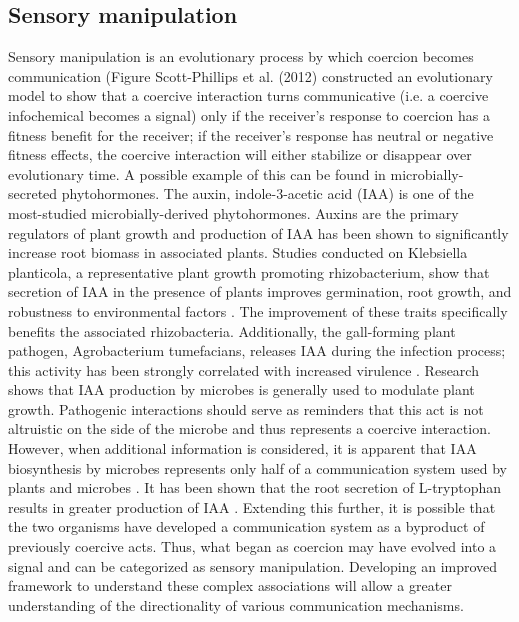 \subsection{Sensory manipulation} 
Sensory manipulation is an evolutionary process by which coercion becomes communication (Figure Scott-Phillips et al. (2012) constructed an evolutionary model to show that a coercive interaction turns communicative (i.e. a coercive infochemical becomes a signal) only if the receiver’s response to coercion has a fitness benefit for the receiver; if the receiver’s response has neutral or negative fitness effects, the coercive interaction will either stabilize or disappear over evolutionary time. 
A possible example of this can be found in microbially-secreted phytohormones. The auxin, indole-3-acetic acid (IAA) is one of the most-studied microbially-derived phytohormones. Auxins are the primary regulators of plant growth and production of IAA has been shown to significantly increase root biomass in associated plants. Studies conducted on Klebsiella planticola, a representative plant growth promoting rhizobacterium, show that secretion of IAA in the presence of plants improves germination, root growth, and robustness to environmental factors \parencite{blinkov2014}. The improvement of these traits specifically benefits the associated rhizobacteria. Additionally, the gall-forming plant pathogen, Agrobacterium tumefacians, releases IAA during the infection process; this activity has been strongly correlated with increased virulence \parencite{morris1986}. Research shows that IAA production by microbes is generally used to modulate plant growth. Pathogenic interactions should serve as reminders that this act is not altruistic on the side of the microbe and thus represents a coercive interaction. However, when additional information is considered, it is apparent that IAA biosynthesis by microbes represents only half of a communication system used by plants and microbes \parencite{lambrecht2000}. It has been shown that the root secretion of L-tryptophan results in greater production of IAA \parencite{karnwal2009}. Extending this further, it is possible that the two organisms have developed a communication system as a byproduct of previously coercive acts. Thus, what began as coercion may have evolved into a signal and can be categorized as sensory manipulation. Developing an improved framework to understand these complex associations will allow a greater understanding of the directionality of various communication mechanisms. 
